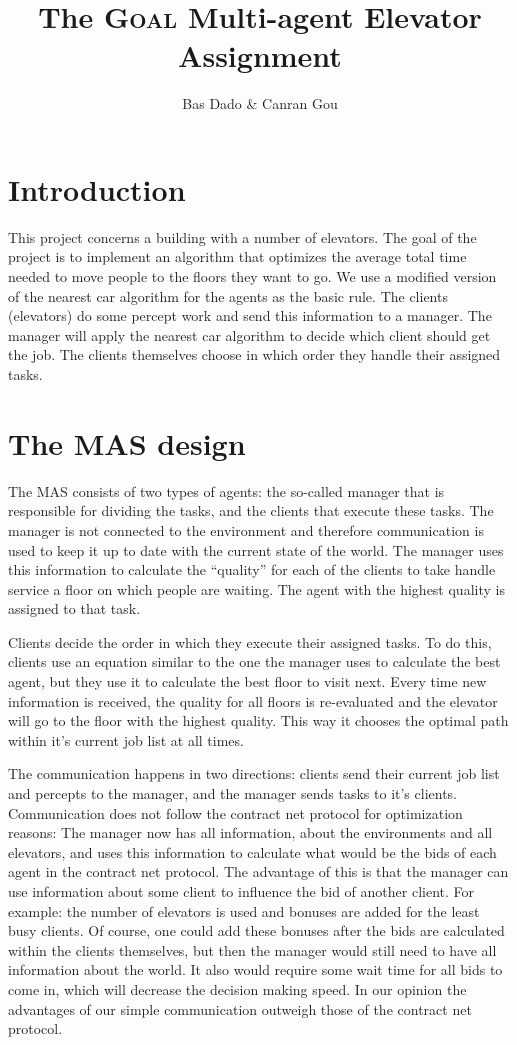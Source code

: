 \documentclass[a4paper,10pt,twocolumn]{article}
\title{The \textsc{Goal} Multi-agent Elevator Assignment}
\author{Bas Dado \& Canran Gou}
\begin{document}
\maketitle

\section{Introduction}
This project concerns a building with a number of elevators. The goal of the project is to implement an algorithm that optimizes the average total time needed to move people to the floors they want to go. We use a modified version of the nearest car algorithm for the agents as the basic rule. The clients (elevators) do some percept work and send this information to a manager. The manager will apply the nearest car algorithm to decide which client should get the job.
The clients themselves choose in which order they handle their assigned tasks.

\section{The MAS design}
The MAS consists of two types of agents: the so-called manager that is responsible for dividing the tasks, and the clients that execute these tasks. The manager is not connected to the environment and therefore communication is used to keep it up to date with the current state of the world. The manager uses this information  to calculate the ``quality'' for each of the clients to take handle service a floor on which people are waiting. The agent with the highest quality is assigned to that task. 

Clients decide the order in which they execute their assigned tasks. To do this, clients use an equation similar to the one the manager uses to calculate the best agent, but they use it to calculate the best floor to visit next. Every time new information is received, the quality for all floors is re-evaluated and the elevator will go to the floor with the highest quality. This way it chooses the optimal path within it's current job list at all times.

The communication happens in two directions: clients send their current job list and percepts to the manager, and the manager sends tasks to it's clients. Communication does not follow the contract net protocol for optimization reasons: The manager now has all information, about the environments and all elevators, and uses this information to calculate what would be the bids of each agent in the contract net protocol. The advantage of this is that the manager can use information about some client to influence the bid of another client. For example: the number of elevators is used and bonuses are added for the least busy clients. Of course, one could add these bonuses after the bids are calculated within the clients themselves, but then the manager would still need to have all information about the world. It also would require some wait time for all bids to come in, which will decrease the decision making speed. In our opinion the advantages of our simple communication outweigh those of the contract net protocol.
\end{document}

